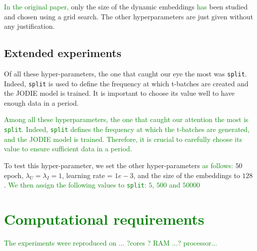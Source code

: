 \textcolor{green}{In the original paper, }only the size of the dynamic embeddings \textcolor{green}{has} %
been studied and chosen using a grid search. The other hyperparameters are just given without any justification.

\subsection{Extended experiments}


Of all these hyper-parameters, the one that caught our eye the most was \texttt{split}. Indeed, \texttt{split} is used to define the frequency at which t-batches are created and the JODIE model is trained. It is important to choose its value well to have enough data in a period. 

\textcolor{green}{Among all these hyperparameters, the one that caught our attention the most is \texttt{split}. Indeed, \texttt{split} defines the frequency at which the t-batches are generated, and the JODIE model is trained. Therefore, it is crucial to carefully choose its value to ensure sufficient data in a period. }

To test this hyper-parameter, we set the other hyper-parameters \textcolor{green}{as follows: }%
$50$ epoch, $\lambda_U = \lambda_I = 1$, learning rate = $1e-3$, and the size of the embeddings to $128$. \textcolor{green}{We then assign the following values to \texttt{split}: $5$, $500$ and $50000$}




\section{\textcolor{green}{Computational requirements}}
\textcolor{green}{The experiments were reproduced on ... ?cores ? RAM ...? processor...}




